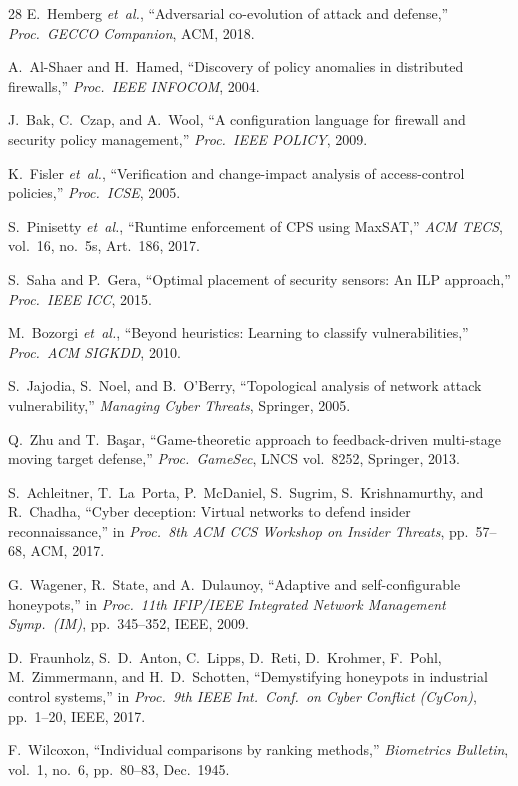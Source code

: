 \documentclass[journal]{IEEEtran}
\newcommand{\etal}{\emph{et~al.}}
\begin{document}
\begin{thebibliography}{28}
E.~Hemberg \etal{},
``Adversarial co-evolution of attack and defense,''
\textit{Proc.\ GECCO Companion}, ACM, 2018.

A.~Al-Shaer and H.~Hamed,
``Discovery of policy anomalies in distributed firewalls,''
\textit{Proc.\ IEEE INFOCOM}, 2004.

J.~Bak, C.~Czap, and A.~Wool,
``A configuration language for firewall and security policy
management,'' \textit{Proc.\ IEEE POLICY}, 2009.

K.~Fisler \etal{},
``Verification and change-impact analysis of access-control
policies,'' \textit{Proc.\ ICSE}, 2005.

S.~Pinisetty \etal{},
``Runtime enforcement of CPS using MaxSAT,''
\textit{ACM TECS}, vol.~16, no.~5s, Art.~186, 2017.

S.~Saha and P.~Gera,
``Optimal placement of security sensors: An ILP approach,''
\textit{Proc.\ IEEE ICC}, 2015.

M.~Bozorgi \etal{},
``Beyond heuristics: Learning to classify vulnerabilities,''
\textit{Proc.\ ACM SIGKDD}, 2010.

S.~Jajodia, S.~Noel, and B.~O'Berry,
``Topological analysis of network attack vulnerability,''
\textit{Managing Cyber Threats}, Springer, 2005.

Q.~Zhu and T.~Ba\c{s}ar,
``Game-theoretic approach to feedback-driven multi-stage
moving target defense,''
\textit{Proc.\ GameSec}, LNCS vol.~8252, Springer, 2013.

S.~Achleitner, T.~La~Porta, P.~McDaniel, S.~Sugrim,
S.~Krishnamurthy, and R.~Chadha,
``Cyber deception: Virtual networks to defend insider
reconnaissance,''
in \textit{Proc.\ 8th ACM CCS Workshop on Insider
Threats}, pp.~57--68, ACM, 2017.

G.~Wagener, R.~State, and A.~Dulaunoy,
``Adaptive and self-configurable honeypots,''
in \textit{Proc.\ 11th IFIP/IEEE Integrated Network
Management Symp.\ (IM)}, pp.~345--352, IEEE, 2009.

D.~Fraunholz, S.~D.~Anton, C.~Lipps, D.~Reti,
D.~Krohmer, F.~Pohl, M.~Zimmermann, and H.~D.~Schotten,
``Demystifying honeypots in industrial control systems,''
in \textit{Proc.\ 9th IEEE Int.\ Conf.\ on Cyber Conflict
(CyCon)}, pp.~1--20, IEEE, 2017.

F.~Wilcoxon,
``Individual comparisons by ranking methods,''
\textit{Biometrics Bulletin}, vol.~1, no.~6,
pp.~80--83, Dec.~1945.

\end{thebibliography}
\end{document}
